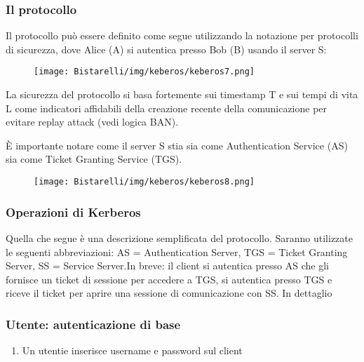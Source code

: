 \subsubsection{Il protocollo}
Il protocollo può essere definito come segue utilizzando la notazione per protocolli di sicurezza, dove Alice (A) si
autentica presso Bob (B) usando il server S:

\begin{figure}[H]
	\centering
    \texttt{[image: Bistarelli/img/keberos/keberos7.png]}
\end{figure}

La sicurezza del protocollo si basa fortemente sui timestamp T e sui tempi di vita L come indicatori affidabili della
creazione recente della comunicazione per evitare replay attack (vedi logica BAN).

\singlespacing

È importante notare come il server S stia sia come Authentication Service (AS) sia come Ticket Granting Service
(TGS).

\begin{figure}[H]
	\centering
    \texttt{[image: Bistarelli/img/keberos/keberos8.png]}
\end{figure}
\subsubsection{Operazioni di Kerberos}
Quella che segue è una descrizione semplificata del protocollo. Saranno utilizzate le seguenti abbreviazioni: AS =
Authentication Server, TGS = Ticket Granting Server, SS = Service Server.In breve: il client si autentica presso AS
che gli fornisce un ticket di sessione per accedere a TGS, si autentica presso TGS e riceve il ticket per aprire una
sessione di comunicazione con SS. In dettaglio
\subsubsection{Utente: autenticazione di base}
\begin{enumerate}
    \item Un utentie inserisce username e password sul client
\end{enumerate}
